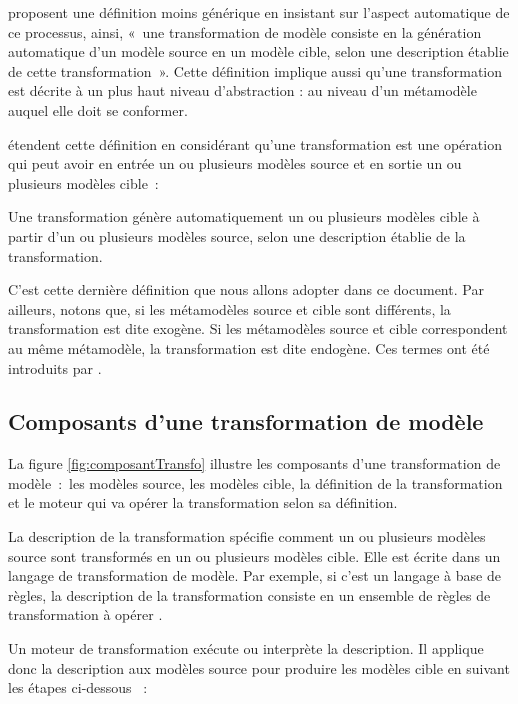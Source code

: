 \cite{kleppe2003mda} proposent une définition moins générique en insistant sur 
l'aspect automatique de ce processus, ainsi, «~une transformation de modèle 
consiste en la génération automatique d'un modèle source en un modèle cible, 
selon une description établie de cette transformation~». Cette définition 
implique aussi qu'une transformation est décrite à un plus haut niveau 
d'abstraction : au niveau d'un métamodèle auquel elle doit se conformer. 

\cite{mens2006taxonomy} étendent cette définition en considérant qu'une 
transformation est une opération qui peut avoir en entrée un ou plusieurs 
modèles source et en sortie un ou plusieurs modèles cible~: 

\begin{definition}
Une transformation génère automatiquement un ou plusieurs modèles cible à partir 
d'un ou plusieurs modèles source, selon une description établie de la 
transformation. 
\end{definition}

C'est cette dernière définition que nous allons adopter dans ce document. Par 
ailleurs, notons que, si les métamodèles source et cible sont différents, la 
transformation est dite exogène. Si les métamodèles source et cible 
correspondent au même métamodèle, la transformation est dite endogène. Ces 
termes ont été introduits par \cite{mens2006taxonomy}.

\subsection{Composants d'une transformation de modèle} 
La figure \ref{fig:composantTransfo} illustre les composants d'une 
transformation de modèle~:~les modèles source, les modèles cible, la définition 
de la transformation et le moteur qui va opérer la transformation selon sa 
définition. 

La description de la transformation spécifie comment un ou plusieurs modèles 
source sont transformés en un ou plusieurs modèles cible. Elle est écrite dans 
un langage de transformation de modèle. Par exemple, si c'est un langage à base 
de règles, la description de la transformation consiste en un ensemble de règles 
de transformation à opérer \cite{kleppe2003mda}. 

Un moteur de transformation exécute ou interprète la description. Il applique 
donc la description aux modèles source pour produire les modèles cible en 
suivant les étapes ci-dessous \cite{tratt2005model}~:

